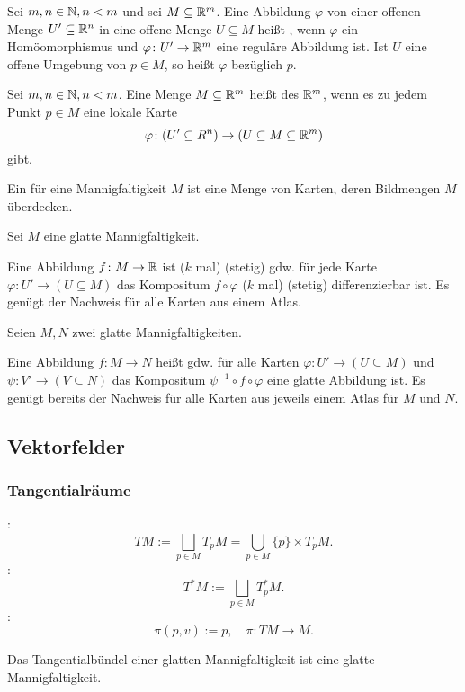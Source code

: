 \begin{Definition}
Sei $m,n\in\mathbb N, n<m$ und sei $M\subseteq\mathbb R^m$.
Eine Abbildung $\varphi$ von einer offenen Menge $U'\subseteq\mathbb R^n$
in eine offene Menge $U\subseteq M$ heißt ,
wenn $\varphi$ ein Homöomorphismus und $\varphi\colon U'\to\mathbb R^m$
eine reguläre Abbildung ist. Ist $U$ eine offene Umgebung von
$p\in M$, so heißt $\varphi$  bezüglich $p$.
\end{Definition}
\pagebreak[1]
\begin{Definition}
Sei $m,n\in\mathbb N, n<m$. Eine Menge $M\subseteq\mathbb R^m$ heißt
 des $\mathbb R^m$, wenn
es zu jedem Punkt $p\in M$ eine lokale Karte
\begin{equation}
\varphi\colon (U'\subseteq R^n)\to (U\subseteq M\subseteq\mathbb R^m)
\end{equation}
gibt.
\end{Definition}
\begin{Definition} Ein  für eine Mannigfaltigkeit $M$
ist eine Menge von Karten, deren Bildmengen $M$ überdecken.
\end{Definition}
Sei $M$ eine glatte Mannigfaltigkeit.
\begin{Definition}
Eine Abbildung $f\colon M\to\mathbb R$ ist ($k$ mal) (stetig)
gdw. für jede Karte $\varphi\colon U'\to (U\subseteq M)$ das
Kompositum $f\circ\varphi$ ($k$ mal) (stetig) differenzierbar ist.
Es genügt der Nachweis für alle Karten aus einem Atlas.
\end{Definition}
Seien $M,N$ zwei glatte Mannigfaltigkeiten.
\begin{Definition} Eine Abbildung $f\colon M\to N$ heißt 
gdw. für alle Karten $\varphi\colon U'\to (U\subseteq M)$ und
$\psi\colon V'\to (V\subseteq N)$ das Kompositum
$\psi^{-1}\circ f\circ\varphi$ eine glatte Abbildung ist.
Es genügt bereits der Nachweis für alle Karten aus jeweils einem
Atlas für $M$ und $N$.
\end{Definition}


\subsection{Vektorfelder}
\subsubsection{Tangentialräume}
\begin{Definition} :
\begin{equation}
TM := \bigsqcup_{p\in M} T_p M = \bigcup_{p\in M} \{p\}\times T_p M.
\end{equation}
:
\begin{equation}
T^*M := \bigsqcup_{p\in M} T_p^* M.
\end{equation}
:
\begin{equation}
\pi(p,v):=p,\quad\pi\colon TM\to M.
\end{equation}
\end{Definition}
\noindent
Das Tangentialbündel einer glatten Mannigfaltigkeit ist eine
glatte Mannigfaltigkeit.

